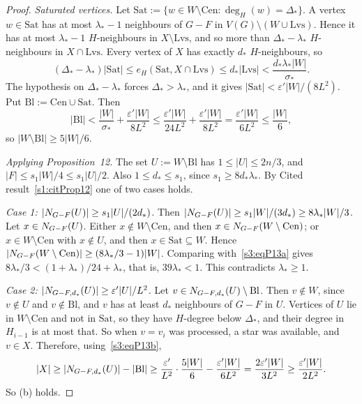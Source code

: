 \begin{proof}
\smallskip\noindent\emph{Saturated vertices.} Let
$\mathrm{Sat}:=\{w\in W\setminus\mathrm{Cen}:\deg_H(w)=\Delta_*\}$. A
vertex $w\in\mathrm{Sat}$ has at most $\lambda_*-1$ neighbours of $G-F$
in $V(G)\setminus(W\cup\mathrm{Lvs})$. Hence it has at most
$\lambda_*-1$ $H$-neighbours in $X\setminus\mathrm{Lvs}$, and so more
than $\Delta_*-\lambda_*$ $H$-neighbours in $X\cap\mathrm{Lvs}$. Every
vertex of $X$ has exactly $d_*$ $H$-neighbours, so
\[
(\Delta_*-\lambda_*)|\mathrm{Sat}|\le e_H(\mathrm{Sat},X\cap\mathrm{Lvs})\le d_*|\mathrm{Lvs}|<\frac{d_*\lambda_*|W|}{\sigma_*}.
\]
The hypothesis on $\Delta_*-\lambda_*$ forces $\Delta_*>\lambda_*$, and it
gives $|\mathrm{Sat}|<\varepsilon'|W|/(8L^2)$. Put
$\mathrm{Bl}:=\mathrm{Cen}\cup\mathrm{Sat}$. Then
\begin{equation}\label{s3:eqP13b}
|\mathrm{Bl}|<\frac{|W|}{\sigma_*}+\frac{\varepsilon'|W|}{8L^2}\le\frac{\varepsilon'|W|}{24L^2}+\frac{\varepsilon'|W|}{8L^2}=\frac{\varepsilon'|W|}{6L^2}\le\frac{|W|}{6},
\end{equation}
so $|W\setminus\mathrm{Bl}|\ge 5|W|/6$.

\smallskip\noindent\emph{Applying Proposition~12.} The set
$U:=W\setminus\mathrm{Bl}$ has $1\le|U|\le 2n/3$, and
$|F|\le s_1|W|/4\le s_1|U|/2$. Also $1\le d_*\le s_1$, since
$s_1\ge 8d_*\lambda_*$. By Cited result~\ref{s1:citProp12} one of two cases
holds.

\emph{Case 1: $|N_{G-F}(U)|\ge s_1|U|/(2d_*)$.} Then
$|N_{G-F}(U)|\ge s_1|W|/(3d_*)\ge 8\lambda_*|W|/3$. Let
$x\in N_{G-F}(U)$. Either $x\notin W\setminus\mathrm{Cen}$, and then
$x\in N_{G-F}(W\setminus\mathrm{Cen})$; or $x\in W\setminus\mathrm{Cen}$
with $x\notin U$, and then $x\in\mathrm{Sat}\subseteq W$. Hence
$|N_{G-F}(W\setminus\mathrm{Cen})|\ge(8\lambda_*/3-1)|W|$. Comparing
with~\eqref{s3:eqP13a} gives $8\lambda_*/3<(1+\lambda_*)/24+\lambda_*$,
that is, $39\lambda_*<1$. This contradicts $\lambda_*\ge1$.

\emph{Case 2: $|N_{G-F,d_*}(U)|\ge\varepsilon'|U|/L^2$.} Let
$v\in N_{G-F,d_*}(U)\setminus\mathrm{Bl}$. Then $v\notin W$, since
$v\notin U$ and $v\notin\mathrm{Bl}$, and $v$ has at least $d_*$
neighbours of $G-F$ in $U$. Vertices of $U$ lie in
$W\setminus\mathrm{Cen}$ and not in $\mathrm{Sat}$, so they have
$H$-degree below $\Delta_*$, and their degree in $H_{i-1}$ is at most
that. So when $v=v_i$ was processed, a star was available, and $v\in X$.
Therefore, using~\eqref{s3:eqP13b},
\[
|X|\ge|N_{G-F,d_*}(U)|-|\mathrm{Bl}|\ge\frac{\varepsilon'}{L^2}\cdot\frac{5|W|}{6}-\frac{\varepsilon'|W|}{6L^2}=\frac{2\varepsilon'|W|}{3L^2}\ge\frac{\varepsilon'|W|}{2L^2}.
\]
So (b) holds.
\end{proof}

